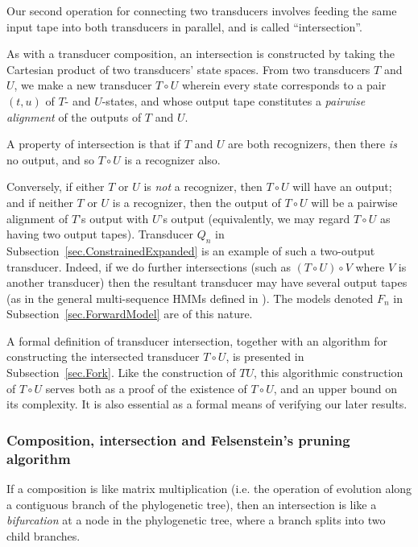 \documentclass{article}
\newcommand{\secref}[1]{Subsection~\ref{sec.#1}}
\newcommand{\seclabel}[1]{\label{sec.#1}}
\newcommand\fork{\circ}
\begin{document}
Our second operation for connecting two transducers
involves feeding the same input tape into both transducers in parallel,
and is called ``intersection''.

As with a transducer composition,
an intersection is constructed by taking the Cartesian product of two transducers' state spaces.
From two transducers $T$ and $U$,
we make a new transducer $T \fork U$
wherein every state corresponds to a pair $(t,u)$ of $T$- and $U$-states,
and whose output tape constitutes a {\em pairwise alignment} of the outputs of $T$ and $U$.

A property of intersection is that
if $T$ and $U$ are both recognizers,
then there {\em is} no output, and so $T \fork U$ is a recognizer also.

Conversely, if either $T$ or $U$ is {\em not} a recognizer, then $T \fork U$ will have an output;
and if neither $T$ or $U$ is a recognizer, then the output of $T \fork U$ will be a pairwise alignment
of $T$'s output with $U$'s output
(equivalently, we may regard $T \fork U$ as having two output tapes).
Transducer $Q_n$ in \secref{ConstrainedExpanded} is an example of such a two-output transducer.
Indeed, if we do further intersections (such as $(T \fork U) \fork V$ where $V$ is another transducer)
then the resultant transducer may have several output tapes
(as in the general multi-sequence HMMs defined in \cite{HolmesBruno2001}).
The models denoted $F_n$ in \secref{ForwardModel} are of this nature.

A formal definition of transducer intersection,
together with an algorithm for constructing the intersected transducer $T \fork U$,
is presented in \secref{Fork}. 
Like the construction of $TU$, this algorithmic construction of $T \fork U$
serves both as a proof of the existence of $T \fork U$, and an upper bound on its complexity.
It is also essential as a formal means of verifying our later results.

\subsubsection{Composition, intersection and Felsenstein's pruning algorithm}
\seclabel{Felsenstein}

If a composition is like matrix multiplication
(i.e. the operation of evolution along a contiguous branch of the phylogenetic tree),
then an intersection is like a {\em bifurcation} at a node in the phylogenetic tree,
where a branch splits into two child branches.
\end{document}
